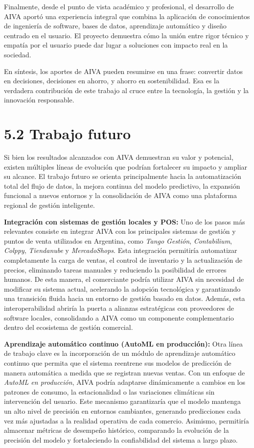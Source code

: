 Finalmente, desde el punto de vista académico y profesional, el desarrollo de AIVA aportó una experiencia integral que combina la aplicación de conocimientos de ingeniería de software, bases de datos, aprendizaje automático y diseño centrado en el usuario.  
El proyecto demuestra cómo la unión entre rigor técnico y empatía por el usuario puede dar lugar a soluciones con impacto real en la sociedad.

En síntesis, los aportes de AIVA pueden resumirse en una frase: convertir datos en decisiones, decisiones en ahorro, y ahorro en sostenibilidad.
Esa es la verdadera contribución de este trabajo al cruce entre la tecnología, la gestión y la innovación responsable.


\section*{5.2 Trabajo futuro}

Si bien los resultados alcanzados con AIVA demuestran su valor y potencial, existen múltiples líneas de evolución que podrían fortalecer su impacto y ampliar su alcance. El trabajo futuro se orienta principalmente hacia la automatización total del flujo de datos, la mejora continua del modelo predictivo, la expansión funcional a nuevos entornos y la consolidación de AIVA como una plataforma regional de gestión inteligente.

\textbf{Integración con sistemas de gestión locales y POS:}  
Uno de los pasos más relevantes consiste en integrar AIVA con los principales sistemas de gestión y puntos de venta utilizados en Argentina, como \textit{Tango Gestión}, \textit{Contabilium}, \textit{Colppy}, \textit{Tiendanube} y \textit{MercadoShops}. Esta integración permitiría automatizar completamente la carga de ventas, el control de inventario y la actualización de precios, eliminando tareas manuales y reduciendo la posibilidad de errores humanos. De esta manera, el comerciante podría utilizar AIVA sin necesidad de modificar su sistema actual, acelerando la adopción tecnológica y garantizando una transición fluida hacia un entorno de gestión basado en datos. Además, esta interoperabilidad abriría la puerta a alianzas estratégicas con proveedores de software locales, consolidando a AIVA como un componente complementario dentro del ecosistema de gestión comercial.

\textbf{Aprendizaje automático continuo (AutoML en producción):}  
Otra línea de trabajo clave es la incorporación de un módulo de aprendizaje automático continuo que permita que el sistema reentrene sus modelos de predicción de manera automática a medida que se registran nuevas ventas. Con un enfoque de \textit{AutoML en producción}, AIVA podría adaptarse dinámicamente a cambios en los patrones de consumo, la estacionalidad o las variaciones climáticas sin intervención del usuario. Este mecanismo garantizaría que el modelo mantenga un alto nivel de precisión en entornos cambiantes, generando predicciones cada vez más ajustadas a la realidad operativa de cada comercio. Asimismo, permitiría almacenar métricas de desempeño histórico, comparando la evolución de la precisión del modelo y fortaleciendo la confiabilidad del sistema a largo plazo.

